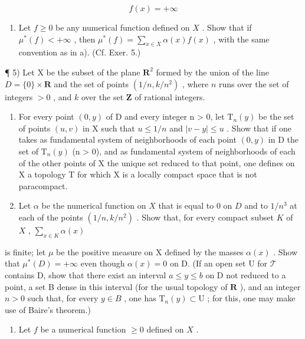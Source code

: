 \[
f (x) = + \infty
\]

\begin{enumerate}
\def\labelenumi{\alph{enumi})}
\setcounter{enumi}{1}
\tightlist
\item
  Let \(f \geqslant 0\) be any numerical function defined on \(X\) . Show that if \(\mu^{*}(f) < +\infty\) , then \(\mu^{*}(f) = \sum_{x \in X} \alpha(x)f(x)\) , with the same convention as in a). (Cf. Exer. 5.)
\end{enumerate}

¶ 5) Let X be the subset of the plane \(\mathbf{R}^2\) formed by the union of the line \(D = \{0\} \times \mathbf{R}\) and the set of points \((1/n, k/n^2)\) , where \(n\) runs over the set of integers \(>0\) , and \(k\) over the set \(\mathbf{Z}\) of rational integers.

\begin{enumerate}
\def\labelenumi{\alph{enumi})}
\item
  For every point \((0,y)\) of D and every integer n \textgreater{} 0, let \(\mathrm{T}_{n}(y)\) be the set of points \((u,v)\) in X such that \(u \leqslant 1/n\) and \(|v - y| \leqslant u\) . Show that if one takes as fundamental system of neighborhoods of each point \((0,y)\) in D the set of \(\mathrm{T}_{n}(y)\) (n \textgreater{} 0), and as fundamental system of neighborhoods of each of the other points of X the unique set reduced to that point, one defines on X a topology T for which X is a locally compact space that is not paracompact.
\item
  Let \(\alpha\) be the numerical function on \(X\) that is equal to 0 on \(D\) and to \(1/n^3\) at each of the points \((1/n, k/n^2)\) . Show that, for every compact subset \(K\) of \(X\) , \(\sum_{x \in K} \alpha(x)\)
\end{enumerate}

is finite; let \(\mu\) be the positive measure on X defined by the masses \(\alpha(x)\) . Show that \(\mu^{*}(D) = +\infty\) even though \(\alpha(x) = 0\) on D. (If an open set U for \(\mathcal{T}\) contains D, show that there exist an interval \(a \leqslant y \leqslant b\) on D not reduced to a point, a set B dense in this interval (for the usual topology of \(\mathbf{R}\) ), and an integer \(n > 0\) such that, for every \(y \in B\) , one has \(\mathrm{T}_{n}(y) \subset \mathrm{U}\) ; for this, one may make use of Baire's theorem.)

\begin{enumerate}
\def\labelenumi{\arabic{enumi})}
\setcounter{enumi}{5}
\tightlist
\item
  Let \(f\) be a numerical function \(\geqslant 0\) defined on \(X\) .
\end{enumerate}

